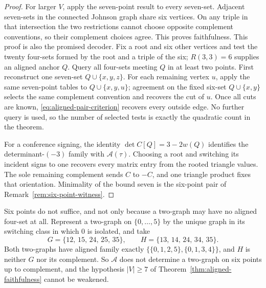 \begin{proof}
For larger \(V\), apply the seven-point result to every seven-set.  Adjacent
seven-sets in the connected Johnson graph share six vertices.  On any triple
in that intersection the two restrictions cannot choose opposite complement
conventions, so their complement choices agree.  This proves faithfulness.
This proof is also the promised decoder.  Fix a root and six other vertices
and test the twenty four-sets formed by the root and a triple of the six;
\(R(3,3)=6\) supplies an aligned anchor \(Q\).  Query all four-sets meeting
\(Q\) in at least two points.  First reconstruct one seven-set
\(Q\cup\{x,y,z\}\).  For each remaining vertex \(u\), apply the same
seven-point tables to \(Q\cup\{x,y,u\}\); agreement on the fixed six-set
\(Q\cup\{x,y\}\) selects the same complement convention and recovers the
cut of \(u\).  Once all cuts are known,
\eqref{eq:aligned-pair-criterion} recovers every outside edge.
No further query is used, so the number of selected tests is exactly the
quadratic count in the theorem.

For a conference signing, the identity
\(\det C[Q]=3-2w(Q)\) identifies the determinant-\((-3)\) family with
\(\mathcal A(\tau)\).  Choosing a root and switching its incident signs to
one recovers every matrix entry from the rooted triangle values.  The sole
remaining complement sends \(C\) to \(-C\), and one triangle product fixes
that orientation.  Minimality of the bound seven is the six-point pair of
Remark~\ref{rem:six-point-witness}.
\end{proof}

\begin{remark}
\label{rem:six-point-witness}
Six points do not suffice, and not only because a two-graph may have no
aligned four-set at all.  Represent a two-graph on \(\{0,\dots,5\}\) by the
unique graph in its switching class in which \(0\) is isolated, and take
\[
 G=\{12,\,15,\,24,\,25,\,35\},
 \qquad
 H=\{13,\,14,\,24,\,34,\,35\}.
\]
Both two-graphs have aligned family exactly
\(\bigl\{\{0,1,2,5\},\{0,1,3,4\}\bigr\}\), and \(H\) is neither \(G\) nor its
complement.  So \(\mathcal A\) does not determine a two-graph on six points up
to complement, and the hypothesis \(|V|\ge7\) of
Theorem~\ref{thm:aligned-faithfulness} cannot be weakened.
\end{remark}

